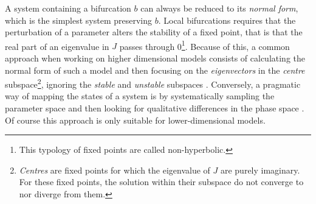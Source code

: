 A system containing a bifurcation $b$ can always be reduced to its \emph{normal form}, which is the simplest system preserving $b$. Local bifurcations requires that the perturbation of a parameter alters the stability of a fixed point, that is that the real part of an eigenvalue in $J$ passes through 0\footnote{This typology of fixed points are called non-hyperbolic.}. Because of this, a common approach when working on higher dimensional models consists of calculating the normal form of such a model and then focusing on the \emph{eigenvectors} in the \emph{centre} subspace\footnote{\emph{Centres} are fixed points for which the eigenvalue of $J$ are purely imaginary. For these fixed points, the solution within their subspace do not converge to nor diverge from them.}, ignoring the \emph{stable} and \emph{unstable} subspaces \citep{borisuk1997, borisuk1998}. Conversely, a pragmatic way of mapping the states of a system is by systematically sampling the parameter space and then looking for 
qualitative differences in the phase space \citep{Araujo2007, Wang2010bifurcation}. Of course this approach is only suitable for lower-dimensional models. 

